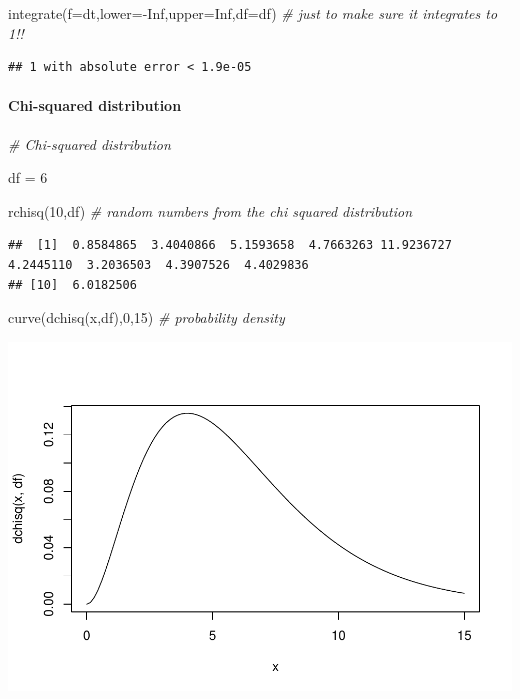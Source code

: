 \documentclass[
]{article}
\newenvironment{Shaded}{\begin{snugshade}}{\end{snugshade}}
\newcommand{\AttributeTok}[1]{\textcolor[rgb]{0.77,0.63,0.00}{#1}}
\newcommand{\CommentTok}[1]{\textcolor[rgb]{0.56,0.35,0.01}{\textit{#1}}}
\newcommand{\ConstantTok}[1]{\textcolor[rgb]{0.00,0.00,0.00}{#1}}
\newcommand{\DecValTok}[1]{\textcolor[rgb]{0.00,0.00,0.81}{#1}}
\newcommand{\FunctionTok}[1]{\textcolor[rgb]{0.00,0.00,0.00}{#1}}
\newcommand{\NormalTok}[1]{#1}
\newcommand{\OtherTok}[1]{\textcolor[rgb]{0.56,0.35,0.01}{#1}}
\newcommand{\SpecialCharTok}[1]{\textcolor[rgb]{0.00,0.00,0.00}{#1}}
\begin{document}
\begin{Shaded}
\begin{Highlighting}[]
\FunctionTok{integrate}\NormalTok{(}\AttributeTok{f=}\NormalTok{dt,}\AttributeTok{lower=}\SpecialCharTok{{-}}\ConstantTok{Inf}\NormalTok{,}\AttributeTok{upper=}\ConstantTok{Inf}\NormalTok{,}\AttributeTok{df=}\NormalTok{df)    }\CommentTok{\# just to make sure it integrates to 1!!}
\end{Highlighting}
\end{Shaded}

\begin{verbatim}
## 1 with absolute error < 1.9e-05
\end{verbatim}

\hypertarget{chi-squared-distribution}{%
\paragraph{Chi-squared distribution}\label{chi-squared-distribution}}

\begin{Shaded}
\begin{Highlighting}[]
\CommentTok{\# Chi{-}squared distribution}

\NormalTok{df }\OtherTok{=} \DecValTok{6}

\FunctionTok{rchisq}\NormalTok{(}\DecValTok{10}\NormalTok{,df)     }\CommentTok{\# random numbers from the chi squared distribution}
\end{Highlighting}
\end{Shaded}

\begin{verbatim}
##  [1]  0.8584865  3.4040866  5.1593658  4.7663263 11.9236727  4.2445110  3.2036503  4.3907526  4.4029836
## [10]  6.0182506
\end{verbatim}

\begin{Shaded}
\begin{Highlighting}[]
\FunctionTok{curve}\NormalTok{(}\FunctionTok{dchisq}\NormalTok{(x,df),}\DecValTok{0}\NormalTok{,}\DecValTok{15}\NormalTok{)   }\CommentTok{\# probability density}
\end{Highlighting}
\end{Shaded}

\includegraphics{LECTURE2_files/figure-latex/unnamed-chunk-23-1.pdf}
\end{document}
